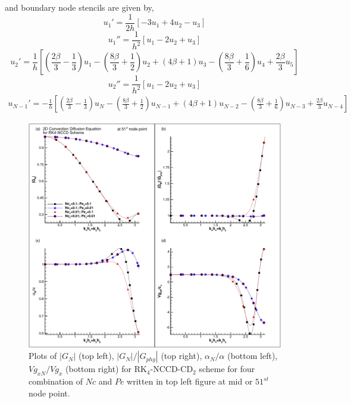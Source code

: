 \documentclass[showpacs,preprintnumbers,amsmath,amssymb]{revtex4-1} %
\begin{document}
and boundary node stencils are given by,
\begin{equation}
u_1'=\frac{1}{2h}[-3u_1+4u_2-u_3]
\end{equation}
\begin{equation}
u_1''=\frac{1}{h^2}[u_1-2u_2+u_3]
\end{equation}
\begin{equation}
u_2'=\frac{1}{h} \left[ \left( \frac{2\beta}{3}-\frac{1}{3}\right)u_1-\left( \frac{8\beta}{3}+\frac{1}{2}\right)u_2+(4\beta+1)u_3-\left( \frac{8\beta}{3}+\frac{1}{6}\right)u_4+\frac{2\beta}{3}u_5\right]
\end{equation}
\begin{equation}
u_2''=\frac{1}{h^2}[u_1-2u_2+u_3]
\end{equation}
\begin{equation}
\begin{aligned}
u_{N-1}'=-\frac{1}{h} \left[ \left( \frac{2\beta}{3}-\frac{1}{3}\right)u_N-\left( \frac{8\beta}{3}+\frac{1}{2}\right)u_{N-1}+(4\beta+1)u_{N-2}
-\left( \frac{8\beta}{3}+\frac{1}{6}\right)u_{N-3}+\frac{2\beta}{3}u_{N-4}\right]
\end{aligned}
\end{equation}

\begin{figure}[h]
\begin{center}
\includegraphics[width=150mm]{prop_NCCD_mid_pt.pdf}
\end{center}
\raggedleft
\caption{Plots of $|G_N|$ (top left), $|G_N|/|G_{phy}|$ (top right), $\alpha_N/\alpha$ (bottom left), $Vg_{xN}/Vg_x$ (bottom right) for RK$_4$-NCCD-CD$_2$ scheme for four combination of $Nc$ and $Pe$ written in top left figure at mid or $51^{st}$ node point.}
\label{fig_NCCD}
\end{figure}
\end{document}
